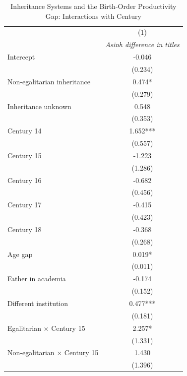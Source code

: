 \begin{table}[H]
\centering
\caption{Inheritance Systems and the Birth-Order Productivity Gap: Interactions with Century}
\label{tab:inheritance_century}

\begin{tablebody}
\begin{tabular}{p{6.8cm} c}
\toprule
 & (1) \\
 & \textit{Asinh difference in titles} \\
\midrule

Intercept
& -0.046 \\
& (0.234) \\

Non-egalitarian inheritance
& 0.474* \\
& (0.279) \\

Inheritance unknown
& 0.548 \\
& (0.353) \\

Century 14
& 1.652*** \\
& (0.557) \\

Century 15
& -1.223 \\
& (1.286) \\

Century 16
& -0.682 \\
& (0.456) \\

Century 17
& -0.415 \\
& (0.423) \\

Century 18
& -0.368 \\
& (0.268) \\

Age gap
& 0.019* \\
& (0.011) \\

Father in academia
& -0.174 \\
& (0.152) \\

Different institution
& 0.477*** \\
& (0.181) \\

Egalitarian $\times$ Century 15
& 2.257* \\
& (1.331) \\

Non-egalitarian $\times$ Century 15
& 1.430 \\
& (1.396) \\


\end{tabular}
\end{tablebody}
\end{table}
